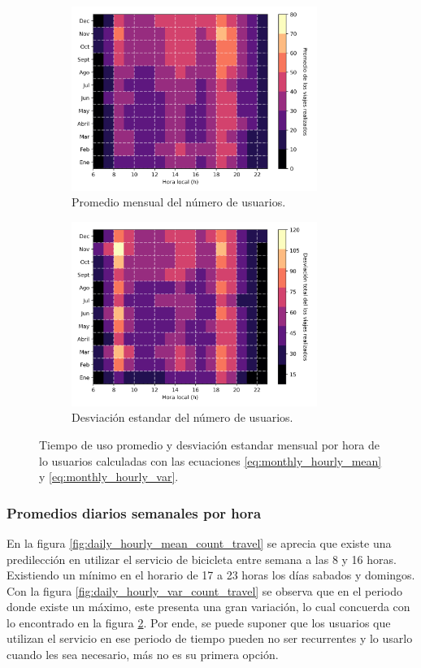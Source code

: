 \begin{figure}[H]
    \centering
    \begin{subfigure}[b]{8cm}
        \includegraphics[width=8cm]{Graphics/monthly_hourly_mean_count_travel.png}
        \caption{Promedio mensual del número de usuarios.}
        \label{fig:monthly_hourly_mean_count_travel}
    \end{subfigure}
    \begin{subfigure}[b]{8cm}
        \includegraphics[width=8cm]{Graphics/monthly_hourly_var_count_travel.png}
        \caption{Desviación estandar del número de usuarios.}
        \label{fig:monthly_hourly_var_count_travel}
    \end{subfigure}
    \caption{Tiempo de uso promedio y desviación estandar mensual por hora de lo usuarios calculadas con las ecuaciones \ref{eq:monthly_hourly_mean} y \ref{eq:monthly_hourly_var}.}
    \label{fig:monthly_hourly_count_travel}
\end{figure}

\subsubsection{Promedios diarios semanales por hora}

En la figura \ref{fig:daily_hourly_mean_count_travel} se aprecia que existe una predilección en utilizar el servicio de bicicleta entre semana a las 8 y 16 horas. Existiendo un mínimo en el horario de 17 a 23 horas los días sabados y domingos. Con la figura \ref{fig:daily_hourly_var_count_travel} se observa que en el periodo donde existe un máximo, este presenta una gran variación, lo cual concuerda con lo encontrado en la figura \ref{fig:monthly_hourly_var_count_travel}. Por ende, se puede suponer que los usuarios que utilizan el servicio en ese periodo de tiempo pueden no ser recurrentes y lo usarlo cuando les sea necesario, más no es su primera opción.

